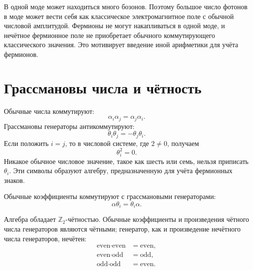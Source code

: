 В одной моде может находиться много бозонов. Поэтому большое число фотонов в моде может вести себя как классическое электромагнитное поле с обычной числовой амплитудой. Фермионы не могут накапливаться в одной моде, и нечётное фермионное поле не приобретает обычного коммутирующего классического значения. Это мотивирует введение иной арифметики для учёта фермионов.

\section{Грассмановы числа и чётность}

Обычные числа коммутируют:
\begin{equation}
\alpha_i\alpha_j=\alpha_j\alpha_i.
\end{equation}
Грассмановы генераторы антикоммутируют:
\begin{equation}
\theta_i\theta_j=-\theta_j\theta_i.
\end{equation}
Если положить \(i=j\), то в числовой системе, где \(2\neq0\), получаем
\begin{equation}
\theta_i^2=0.
\end{equation}
Никакое обычное числовое значение, такое как шесть или семь, нельзя приписать \(\theta_i\). Эти символы образуют алгебру, предназначенную для учёта фермионных знаков.

Обычные коэффициенты коммутируют с грассмановыми генераторами:
\begin{equation}
\alpha\theta_i=\theta_i\alpha.
\end{equation}

\begin{classroomqa}
\end{classroomqa}

Алгебра обладает \(\mathbb Z_2\)-чётностью. Обычные коэффициенты и произведения чётного числа генераторов являются чётными; генератор, как и произведение нечётного числа генераторов, нечётен:
\begin{equation}
\begin{aligned}
\text{even}\cdot\text{even}&=\text{even},\\
\text{even}\cdot\text{odd}&=\text{odd},\\
\text{odd}\cdot\text{odd}&=\text{even}.
\end{aligned}
\end{equation}

